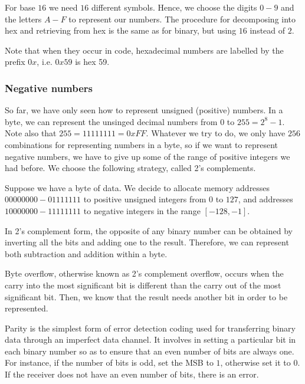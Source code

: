 \documentclass{article}
\begin{document}
\begin{proposition}[Hexadecimal]
    For base $16$ we need $16$ different symbols. Hence, we choose the digits $0 - 9$ and the letters $A - F$ to represent our numbers. The procedure for decomposing into hex and retrieving from hex is the same as for binary, but using $16$ instead of $2$.
\end{proposition}

Note that when they occur in code, hexadecimal numbers are labelled by the prefix $0x$, i.e. $0x59$ is hex 59.

\subsubsection{Negative numbers}

So far, we have only seen how to represent unsigned (positive) numbers. In a byte, we can represent the unsinged decimal numbers from $0$ to $255 = 2^8 - 1$. Note also that $255 = 11111111 = 0xFF$. Whatever we try to do, we only have $256$ combinations for representing numbers in a byte, so if we want to represent negative numbers, we have to give up some of the range of positive integers we had before. We choose the following strategy, called 2's complements.

\begin{proposition}[2's complement]
    Suppose we have a byte of data. We decide to allocate memory addresses $0000 0000 - 0111 1111$ to positive unsigned integers from $0$ to $127$, and addresses $1000 0000 - 1111 1111$ to negative integers in the range $[-128, -1]$.
\end{proposition}

\begin{proposition}
    In 2's complement form, the opposite of any binary number can be obtained by inverting all the bits and adding one to the result. Therefore, we can represent both subtraction and addition within a byte.
\end{proposition}

\begin{proposition}
    Byte overflow, otherwise known as 2's complement overflow, occurs when the carry into the most significant bit is different than the carry out of the most significant bit. Then, we know that the result needs another bit in order to be represented.
\end{proposition}

\begin{proposition}[Parity]
    Parity is the simplest form of error detection coding used for transferring binary data through an imperfect data channel. It involves in setting a particular bit in each binary number so as to ensure that an even number of bits are always one. For instance, if the number of bits is odd, set the MSB to $1$, otherwise set it to $0$. If the receiver does not have an even number of bits, there is an error.
\end{proposition}
\end{document}
